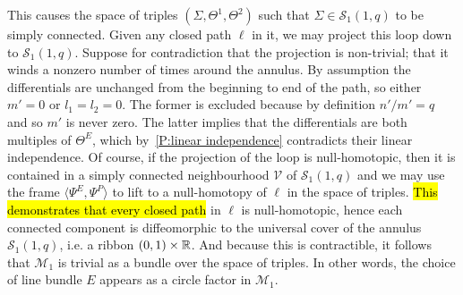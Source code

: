 \documentclass{article}
\begin{document}
This causes the space of triples $(\Sigma,\Theta^1,\Theta^2)$ such that $\Sigma \in \mathcal{S}_1(1,q)$ to be simply connected. Given any closed path $\ell$ in it, we may project this loop down to $\mathcal{S}_1(1,q)$. 
Suppose for contradiction that the projection is non-trivial; that it winds a nonzero number of times around the annulus. By assumption the differentials are unchanged from the beginning to end of the path, so either $m' = 0$ or $l_1=l_2 = 0$. The former is excluded because by definition $n'/m' = q$ and so $m'$ is never zero. The latter implies that the differentials are both multiples of $\Theta^E$, which by~\ref{P:linear independence} contradicts their linear independence. 
Of course, if the projection of the loop is null-homotopic, then it is contained in a simply connected neighbourhood $\mathcal{V}$ of $\mathcal{S}_1(1,q)$ and we may use the frame $\langle \Psi^E,\Psi^P \rangle$ to lift to a null-homotopy of $\ell$ in the space of triples.
\hl{This demonstrates that every closed path} in $\ell$ is null-homotopic, hence each connected component is diffeomorphic to the universal cover of the annulus $\mathcal{S}_1(1,q)$, i.e. a ribbon $(0,1)\times \mathbb{R}$. And because this is contractible, it follows that $\mathcal{M}_1$ is trivial as a bundle over the space of triples. In other words, the choice of line bundle $E$ appears as a circle factor in $\mathcal{M}_1$.
\end{document}
